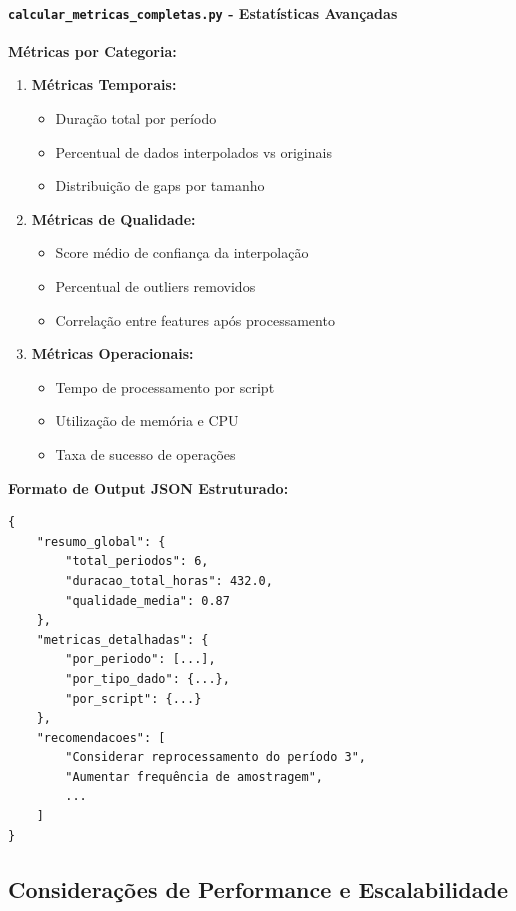 \paragraph{\texttt{calcular\_metricas\_completas.py} - Estatísticas Avançadas}

\textbf{Métricas por Categoria:}

\begin{enumerate}
    \item \textbf{Métricas Temporais:}
    \begin{itemize}
        \item Duração total por período
        \item Percentual de dados interpolados vs originais
        \item Distribuição de gaps por tamanho
    \end{itemize}

    \item \textbf{Métricas de Qualidade:}
    \begin{itemize}
        \item Score médio de confiança da interpolação
        \item Percentual de outliers removidos
        \item Correlação entre features após processamento
    \end{itemize}

    \item \textbf{Métricas Operacionais:}
    \begin{itemize}
        \item Tempo de processamento por script
        \item Utilização de memória e CPU
        \item Taxa de sucesso de operações
    \end{itemize}
\end{enumerate}

\textbf{Formato de Output JSON Estruturado:}
\begin{verbatim}
{
    "resumo_global": {
        "total_periodos": 6,
        "duracao_total_horas": 432.0,
        "qualidade_media": 0.87
    },
    "metricas_detalhadas": {
        "por_periodo": [...],
        "por_tipo_dado": {...},
        "por_script": {...}
    },
    "recomendacoes": [
        "Considerar reprocessamento do período 3",
        "Aumentar frequência de amostragem",
        ...
    ]
}
\end{verbatim}

\subsection{Considerações de Performance e Escalabilidade}

